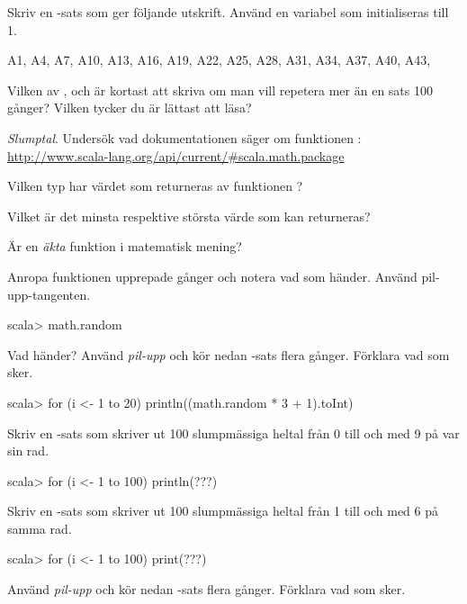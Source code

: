 {{{{{{{\Subtask Skriv en -sats som ger följande utskrift. Använd en variabel  som initialiseras till 1.
\begin{REPLnonum}
A1, A4, A7, A10, A13, A16, A19, A22, A25, A28, A31, A34, A37, A40, A43,
\end{REPLnonum}

\Subtask\Pen Vilken av ,  och  är kortast att skriva om man vill repetera mer än en sats 100 gånger? Vilken tycker du är lättast att läsa?

\Task \textit{Slumptal}. Undersök vad dokumentationen säger om funktionen :\\  %
\url{http://www.scala-lang.org/api/current/#scala.math.package}

\Subtask\Pen Vilken typ har värdet som returneras av funktionen ?

\Subtask\Pen Vilket är det minsta respektive största värde som kan returneras?

\Subtask\Pen Är  en \textit{äkta} funktion  i matematisk mening?

\Subtask Anropa funktionen  upprepade gånger och notera vad som händer. Använd pil-upp-tangenten.
\begin{REPLnonum}
scala> math.random
\end{REPLnonum}


\Subtask Vad händer? Använd \textit{pil-upp} och kör nedan -sats flera gånger. Förklara vad som sker.

\begin{REPLnonum}
scala> for (i <- 1 to 20) println((math.random * 3 + 1).toInt)
\end{REPLnonum}

\Subtask Skriv en -sats som skriver ut 100 slumpmässiga heltal från 0 till och med 9 på var sin rad.

\begin{REPLnonum}
scala> for (i <- 1 to 100) println(???)
\end{REPLnonum}

\Subtask Skriv en -sats som skriver ut 100 slumpmässiga heltal från 1 till och med 6 på samma rad.

\begin{REPLnonum}
scala> for (i <- 1 to 100) print(???)
\end{REPLnonum}


\Subtask Använd \textit{pil-upp} och kör nedan -sats flera gånger. Förklara vad som sker.

}}}}}}}
